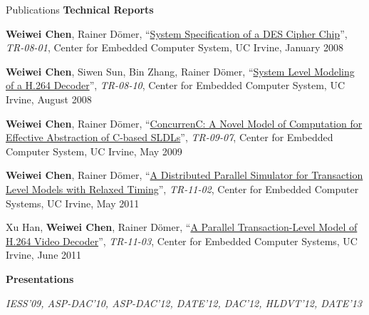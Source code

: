 \documentclass{resume} %
\newcommand{\mypubhl}[6]{
{#1}, {``\href{#2}{#3}''}, {#4}{\textit{#5}}, {#6}
\vspace{-0.5em}
}
\newcommand{\mypub}[5]{
{#1}, {{``#2''}}, {#3}{\textit{#4}}, {#5}
\vspace{-0.5em}
}
\begin{document}
\begin{rSection}{Publications}
{\textbf{\large Technical Reports}}
\vspace{-2mm}
\begin{enumerate}
{\small
\item
	\mypubhl
	{\textbf{Weiwei Chen}, Rainer D\"{o}mer}
	{http://www.cecs.uci.edu/technical_report/TR08-01.pdf}
	{System Specification of a DES Cipher Chip}
	{}
	{TR-08-01}
	{Center for Embedded Computer System, UC Irvine, January 2008}
	
\item
	\mypubhl
	{\textbf{Weiwei Chen}, Siwen Sun, Bin Zhang, Rainer D\"{o}mer}
	{http://www.cecs.uci.edu/technical_report/TR08-10.pdf}
	{System Level Modeling of a H.264 Decoder}
	{}
	{TR-08-10}
	{Center for Embedded Computer System, UC Irvine, August 2008}
	
\item
	\mypubhl
	{\textbf{Weiwei Chen}, Rainer D\"{o}mer}
	{http://www.cecs.uci.edu/technical_report/TR09-07.pdf}
	{ConcurrenC: A Novel Model of Computation for Effective Abstraction of C-based SLDLs}
	{}
	{TR-09-07}
	{Center for Embedded Computer System, UC Irvine, May 2009}
	
\item
	\mypubhl
	{\textbf{Weiwei Chen}, Rainer D\"{o}mer}
	{http://www.cecs.uci.edu/technical_report/TR11-02.pdf}
	{A Distributed Parallel Simulator for Transaction Level Models with Relaxed Timing}
	{}
	{TR-11-02}
	{Center for Embedded Computer Systems, UC Irvine, May 2011}
	
\item
	\mypubhl
	{Xu Han, \textbf{Weiwei Chen}, Rainer D\"{o}mer}
	{http://www.cecs.uci.edu/technical_report/TR11-03.pdf}
	{A Parallel Transaction-Level Model of H.264 Video Decoder}
	{}
	{TR-11-03} 
	{Center for Embedded Computer Systems, UC Irvine, June 2011}
}
\end{enumerate}

{\textbf{\large Presentations}}
\vspace{-2mm}
\begin{itemize}
{\small
\item {\em IESS'09, ASP-DAC'10, ASP-DAC'12, DATE'12, DAC'12, HLDVT'12,  DATE'13} 
}
\end{itemize}
\vspace{-2mm}

\begin{comment}
{\textbf{Poster Presentations}}
\vspace{-2mm}
\begin{enumerate}[\textbf{P\arabic{enumi}.}]
{\small
\item
	\mypub
	{\textbf{Weiwei Chen}, Rainer D\"{o}mer}
	{Parallel Discrete Event Simulation for ESL Design} 
	{in } 
	{SIGDA Ph.D. Forum at the Design Automation Conference (DAC)}
	{San Francisco, USA, June 2012}
	

\end{comment}
\end{rSection}
\end{document}
